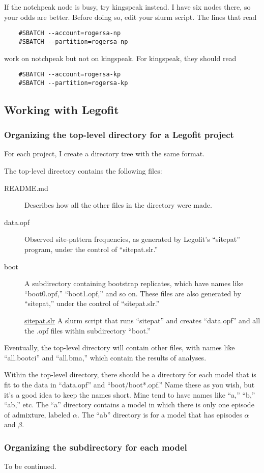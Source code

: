 \documentclass[11pt]{article}
\begin{document}
If the notchpeak node is busy, try kingspeak instead. I have six nodes
there, so your odds are better. Before doing so, edit your slurm
script. The lines that read
\begin{verbatim}
    #SBATCH --account=rogersa-np
    #SBATCH --partition=rogersa-np
\end{verbatim}
work on notchpeak but not on kingspeak. For kingspeak, they should read
\begin{verbatim}
    #SBATCH --account=rogersa-kp
    #SBATCH --partition=rogersa-kp
\end{verbatim}

\subsection{Working with Legofit}
\subsubsection{Organizing the top-level directory for a Legofit project}
For each project, I create a directory tree with the same format.

The
top-level directory contains the following files:
\begin{description}
\item[README.md]
Describes how all the other files in the directory were made.

\item[data.opf]
Observed site-pattern frequencies, as generated by Legofit's
``sitepat'' program, under the control of ``sitepat.slr.''

\item[boot]
A subdirectory containing bootstrap replicates, which have names
like ``boot0.opf,'' ``boot1.opf,'' and so on. These files are also
generated by ``sitepat,'' under the control of ``sitepat.slr.''

\href{sitepat.slr.html}{sitepat.slr}
A slurm script that runs ``sitepat'' and creates ``data.opf'' and all
the .opf files within subdirectory ``boot.''
\end{description}
Eventually, the top-level directory will contain other files, with
names like ``all.bootci'' and ``all.bma,'' which contain the results
of analyses.

Within the top-level directory, there should be a directory for each
model that is fit to the data in ``data.opf'' and ``boot/boot*.opf.''
Name these as you wish, but it's a good idea to keep the names
short. Mine tend to have names like ``a,'' ``b,'' ``ab,'' etc. The
``a'' directory contains a model in which there is only one episode of
admixture, labeled $\alpha$. The ``ab'' directory is for a model that
has episodes $\alpha$ and $\beta$.

\subsubsection{Organizing the subdirectory for each model}

To be continued.

\printbibliography
\end{document}
